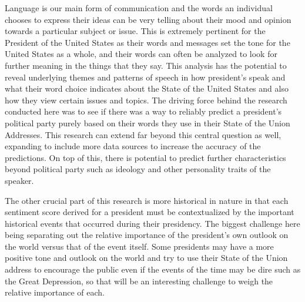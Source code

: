 Language is our main form of communication and the words an individual chooses to express their ideas can be very telling about their mood and opinion towards a particular subject or issue.
This is extremely pertinent for the President of the United States as their words and messages set the tone for the United States as a whole, and their words can often be analyzed to look for further meaning in the things that they say.
This analysis has the potential to reveal underlying themes and patterns of speech in how president's speak and what their word choice indicates about the State of the United States and also how they view certain issues and topics.
The driving force behind the research conducted here was to see if there was a way to reliably predict a president's political party purely based on their words they use in their State of the Union Addresses.
This research can extend far beyond this central question as well, expanding to include more data sources to increase the accuracy of the predictions.
On top of this, there is potential to predict further characteristics beyond political party such as ideology and other personality traits of the speaker.

The other crucial part of this research is more historical in nature in that each sentiment score derived for a president must be contextualized by the important historical events that occurred during their presidency.
The biggest challenge here being separating out the relative importance of the president's own outlook on the world versus that of the event itself.
Some presidents may have a more positive tone and outlook on the world and try to use their State of the Union address to encourage the public even if the events of the time may be dire such as the Great Depression, so that will be an interesting challenge to weigh the relative importance of each.